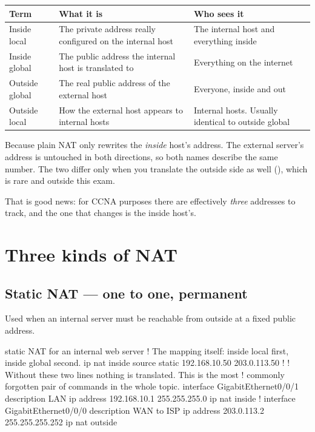 \begin{longtable}{@{}L{3.0cm}L{5.6cm}L{6.3cm}@{}}
\toprule
{}
\textbf{Term} & \textbf{What it is} & \textbf{Who sees it} \\
\midrule
\endhead
Inside local &
The private address really configured on the internal host &
The internal host and everything inside \\
Inside global &
The public address the internal host is translated to &
Everything on the internet \\
Outside global &
The real public address of the external host &
Everyone, inside and out \\
Outside local &
How the external host appears to internal hosts &
Internal hosts. Usually identical to outside global \\
\bottomrule
\end{longtable}

\begin{conceptbox}
Because plain NAT only rewrites the \emph{inside} host's address. The external
server's address is untouched in both directions, so both names describe the same
number. The two differ only when you translate the outside side as well
(), which is rare and outside this exam.

That is good news: for CCNA purposes there are effectively \emph{three} addresses
to track, and the one that changes is the inside host's.
\end{conceptbox}

\section{Three kinds of NAT}

\subsection{Static NAT --- one to one, permanent}

Used when an internal server must be reachable from outside at a fixed public
address.

\begin{config}{static NAT for an internal web server}
! The mapping itself: inside local first, inside global second.
ip nat inside source static 192.168.10.50 203.0.113.50
!
! Without these two lines nothing is translated. This is the most
! commonly forgotten pair of commands in the whole topic.
interface GigabitEthernet0/0/1
 description LAN
 ip address 192.168.10.1 255.255.255.0
 ip nat inside
!
interface GigabitEthernet0/0/0
 description WAN to ISP
 ip address 203.0.113.2 255.255.255.252
 ip nat outside
\end{config}

